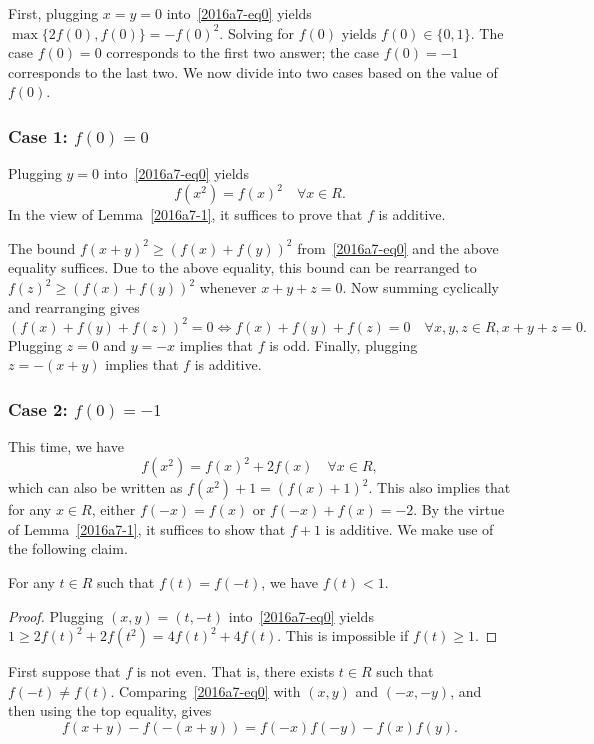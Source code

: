 First, plugging $x = y = 0$ into~\eqref{2016a7-eq0} yields $\max\{2 f(0), f(0)\} = -f(0)^2$.
Solving for $f(0)$ yields $f(0) \in \{0, 1\}$.
The case $f(0) = 0$ corresponds to the first two answer; the case $f(0) = -1$ corresponds to the last two.
We now divide into two cases based on the value of $f(0)$.



\subsubsection*{Case 1: $f(0) = 0$}

Plugging $y = 0$ into~\eqref{2016a7-eq0} yields
\[ f(x^2) = f(x)^2 \quad \forall x \in R. \]
In the view of Lemma~\ref{2016a7-1}, it suffices to prove that $f$ is additive.

The bound $f(x + y)^2 \geq (f(x) + f(y))^2$ from~\eqref{2016a7-eq0} and the above equality suffices.
Due to the above equality, this bound can be rearranged to $f(z)^2 \geq (f(x) + f(y))^2$ whenever $x + y + z = 0$.
Now summing cyclically and rearranging gives
\[ (f(x) + f(y) + f(z))^2 = 0 \iff f(x) + f(y) + f(z) = 0 \quad \forall x, y, z \in R, x + y + z = 0. \]
Plugging $z = 0$ and $y = -x$ implies that $f$ is odd.
Finally, plugging $z = -(x + y)$ implies that $f$ is additive. 



\subsubsection*{Case 2: $f(0) = -1$}

This time, we have
\[ f(x^2) = f(x)^2 + 2 f(x) \quad \forall x \in R, \]
    which can also be written as $f(x^2) + 1 = (f(x) + 1)^2$.
This also implies that for any $x \in R$, either $f(-x) = f(x)$ or $f(-x) + f(x) = -2$.
By the virtue of Lemma~\ref{2016a7-1}, it suffices to show that $f + 1$ is additive.
We make use of the following claim.

\begin{claim}
For any $t \in R$ such that $f(t) = f(-t)$, we have $f(t) < 1$.
\end{claim}
\begin{proof}
Plugging $(x, y) = (t, -t)$ into~\eqref{2016a7-eq0} yields $1 \geq 2 f(t)^2 + 2 f(t^2) = 4 f(t)^2 + 4 f(t)$.
This is impossible if $f(t) \geq 1$.
\end{proof}

First suppose that $f$ is not even.
That is, there exists $t \in R$ such that $f(-t) \neq f(t)$.
Comparing~\eqref{2016a7-eq0} with $(x, y)$ and $(-x, -y)$, and then using the top equality, gives
\[ f(x + y) - f(-(x + y)) = f(-x) f(-y) - f(x) f(y). \tag{1}\label{2016a7-eq1} \]

